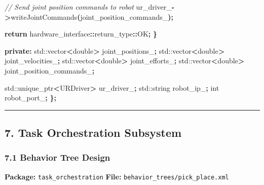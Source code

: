 \documentclass[
]{article}
\newenvironment{Shaded}{\begin{snugshade}}{\end{snugshade}}
\newcommand{\BuiltInTok}[1]{#1}
\newcommand{\CommentTok}[1]{\textcolor[rgb]{0.56,0.35,0.01}{\textit{#1}}}
\newcommand{\ControlFlowTok}[1]{\textcolor[rgb]{0.13,0.29,0.53}{\textbf{#1}}}
\newcommand{\DataTypeTok}[1]{\textcolor[rgb]{0.13,0.29,0.53}{#1}}
\newcommand{\KeywordTok}[1]{\textcolor[rgb]{0.13,0.29,0.53}{\textbf{#1}}}
\newcommand{\NormalTok}[1]{#1}
\newcommand{\OperatorTok}[1]{\textcolor[rgb]{0.81,0.36,0.00}{\textbf{#1}}}
\newcommand{\VariableTok}[1]{\textcolor[rgb]{0.00,0.00,0.00}{#1}}
\begin{document}
\begin{Shaded}
\begin{Highlighting}[]
        \CommentTok{// Send joint position commands to robot}
        \VariableTok{ur\_driver\_}\OperatorTok{{-}\textgreater{}}\NormalTok{writeJointCommands}\OperatorTok{(}\VariableTok{joint\_position\_commands\_}\OperatorTok{);}

        \ControlFlowTok{return}\NormalTok{ hardware\_interface}\OperatorTok{::}\DataTypeTok{return\_type}\OperatorTok{::}\NormalTok{OK}\OperatorTok{;}
    \OperatorTok{\}}

\KeywordTok{private}\OperatorTok{:}
    \BuiltInTok{std::}\NormalTok{vector}\OperatorTok{\textless{}}\DataTypeTok{double}\OperatorTok{\textgreater{}} \VariableTok{joint\_positions\_}\OperatorTok{;}
    \BuiltInTok{std::}\NormalTok{vector}\OperatorTok{\textless{}}\DataTypeTok{double}\OperatorTok{\textgreater{}} \VariableTok{joint\_velocities\_}\OperatorTok{;}
    \BuiltInTok{std::}\NormalTok{vector}\OperatorTok{\textless{}}\DataTypeTok{double}\OperatorTok{\textgreater{}} \VariableTok{joint\_efforts\_}\OperatorTok{;}
    \BuiltInTok{std::}\NormalTok{vector}\OperatorTok{\textless{}}\DataTypeTok{double}\OperatorTok{\textgreater{}} \VariableTok{joint\_position\_commands\_}\OperatorTok{;}

    \BuiltInTok{std::}\NormalTok{unique\_ptr}\OperatorTok{\textless{}}\NormalTok{URDriver}\OperatorTok{\textgreater{}} \VariableTok{ur\_driver\_}\OperatorTok{;}
    \BuiltInTok{std::}\NormalTok{string }\VariableTok{robot\_ip\_}\OperatorTok{;}
    \DataTypeTok{int} \VariableTok{robot\_port\_}\OperatorTok{;}
\OperatorTok{\};}
\end{Highlighting}
\end{Shaded}

\begin{center}\rule{0.5\linewidth}{0.5pt}\end{center}

\hypertarget{task-orchestration-subsystem}{%
\subsection{7. Task Orchestration
Subsystem}\label{task-orchestration-subsystem}}

\hypertarget{behavior-tree-design}{%
\subsubsection{7.1 Behavior Tree Design}\label{behavior-tree-design}}

\textbf{Package:} \texttt{task\_orchestration} \textbf{File:}
\texttt{behavior\_trees/pick\_place.xml}
\end{document}
